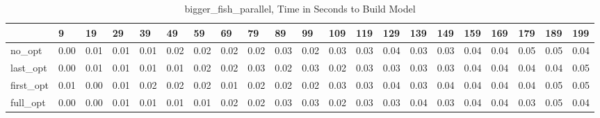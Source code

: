 \begin{table}
\caption{bigger_fish_parallel, Time in Seconds to Build Model}
\label{bigger_fish_parallel_model_time}
\begin{tabular}{lllllllllllllllllllll}
\toprule
 & 9 & 19 & 29 & 39 & 49 & 59 & 69 & 79 & 89 & 99 & 109 & 119 & 129 & 139 & 149 & 159 & 169 & 179 & 189 & 199 \\
\midrule
no_opt & 0.00 & 0.01 & 0.01 & 0.01 & 0.02 & 0.02 & 0.02 & 0.02 & 0.03 & 0.02 & 0.03 & 0.03 & 0.04 & 0.03 & 0.03 & 0.04 & 0.04 & 0.05 & 0.05 & 0.04 \\
last_opt & 0.00 & 0.01 & 0.01 & 0.01 & 0.01 & 0.02 & 0.02 & 0.03 & 0.02 & 0.03 & 0.02 & 0.03 & 0.03 & 0.03 & 0.03 & 0.04 & 0.04 & 0.04 & 0.04 & 0.05 \\
first_opt & 0.01 & 0.00 & 0.01 & 0.02 & 0.02 & 0.02 & 0.01 & 0.02 & 0.02 & 0.02 & 0.03 & 0.03 & 0.04 & 0.03 & 0.04 & 0.04 & 0.04 & 0.04 & 0.05 & 0.05 \\
full_opt & 0.00 & 0.00 & 0.01 & 0.01 & 0.01 & 0.01 & 0.02 & 0.02 & 0.03 & 0.03 & 0.02 & 0.03 & 0.03 & 0.04 & 0.03 & 0.04 & 0.04 & 0.03 & 0.05 & 0.04 \\
\bottomrule
\end{tabular}
\end{table}
